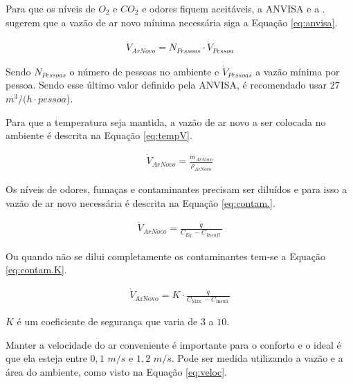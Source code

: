 \documentclass[acronym,symbols,table]{fei}
\begin{document}
Para que os níveis de ${O}_{2}$ e ${CO}_{2}$ e odores fiquem aceitáveis, a ANVISA e a \textcite{abnt216401}. sugerem que a vazão de ar novo mínima necessária siga a Equação \ref{eq:anvisa}.

\begin{equation} \label{eq:anvisa}
\begin{aligned}
    \dot{V}_{ArNovo}=N_{Pessoas}\cdot {\dot{V}_{Pessoa}}
\end{aligned}
\end{equation}

Sendo $N_{Pessoas}$ o número de pessoas no ambiente e $\dot{V}_{Pessoas}$ a vazão mínima por pessoa. Sendo esse último valor definido pela ANVISA, é recomendado usar $27$ $m^3/(h\cdot{pessoa}$).

Para que a temperatura seja mantida, a vazão de ar novo a ser colocada no ambiente é descrita na Equação \ref{eq:tempV}.

\begin{equation} \label{eq:tempV}
\begin{aligned}
    \dot{V}_{ArNovo}=\frac{\dot{m}_{ArNovo}}{\rho_{ArNovo}}
\end{aligned}
\end{equation}

Os níveis de odores, fumaças e contaminantes precisam ser diluídos e para isso a vazão de ar novo necessária é descrita na Equação \ref{eq:contam.}.

\begin{equation} \label{eq:contam.}
    \begin{aligned}
     \dot{V}_{ArNovo}=\frac{\dot{q}}{C_{Eq.}-C_{Insufl.}}
    \end{aligned}
\end{equation}

Ou quando não se dilui completamente os contaminantes tem-se a Equação \ref{eq:contam.K}.

\begin{equation} \label{eq:contam.K}
    \begin{aligned}
\dot{V}_{\text{ArNovo}} = K \cdot \frac{\dot{q}}{C_{\text{Máx.}} - C_{\text{Insufl.}}}
   \end{aligned}
\end{equation}

$K$ é um coeficiente de segurança que varia de $3$ a $10$.

Manter a velocidade do ar conveniente é importante para o conforto e o ideal é que ela esteja entre $0,1$ $m/s$ e $1,2$ $m/s$. Pode ser medida utilizando a vazão e a área do ambiente, como visto na Equação \ref{eq:veloc}.
\end{document}
